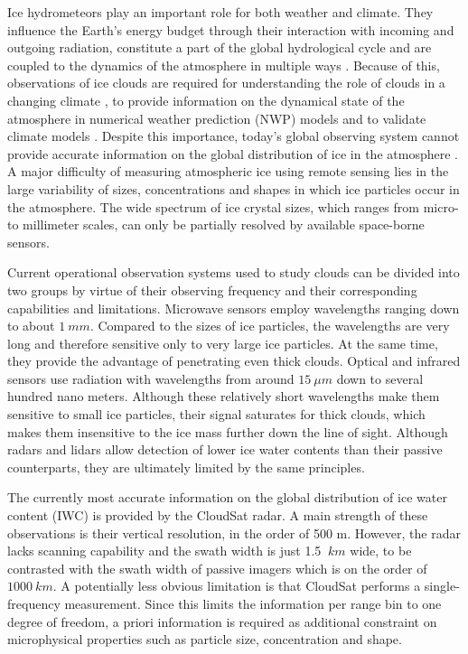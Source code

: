 \documentclass[journal abbreviation, manuscript]{copernicus}
\begin{document}
\introduction  %


Ice hydrometeors play an important role for both weather and climate. They
influence the Earth's energy budget through their interaction with incoming and
outgoing radiation, constitute a part of the global hydrological cycle and are
coupled to the dynamics of the atmosphere in multiple ways \citep{bony15}.
Because of this, observations of ice clouds are required for understanding the
role of clouds in a changing climate \citep{boucher13}, to provide information
on the dynamical state of the atmosphere in numerical weather prediction (NWP)
models \citep{geer} and to validate climate models \citep{waliser09}. Despite
this importance, today's global observing system cannot provide accurate
information on the global distribution of ice in the atmosphere
\citep{eliasson11,duncan18a}. A major difficulty of measuring atmospheric ice using
remote sensing lies in the large variability of sizes, concentrations and shapes
in which ice particles occur in the atmosphere. The wide spectrum of ice crystal
sizes, which ranges from micro- to millimeter scales, can only be partially
resolved by available space-borne sensors.

Current operational observation systems used to study clouds can be divided into
two groups by virtue of their observing frequency and their corresponding
capabilities and limitations. Microwave sensors employ wavelengths ranging down
to about $1\ \unit{mm}$. Compared to the sizes of ice particles, the wavelengths
are very long and therefore sensitive only to very large ice particles. At the
same time, they provide the advantage of penetrating even thick clouds. Optical
and infrared sensors use radiation with wavelengths from around $15\ \unit{\mu
  m}$ down to several hundred nano meters. Although these relatively short
wavelengths make them sensitive to small ice particles, their signal saturates
for thick clouds, which makes them insensitive to the ice mass further down the
line of sight. Although radars and lidars allow detection of lower ice water
contents than their passive counterparts, they are ultimately limited by the
same principles.

The currently most accurate information on the global distribution of ice water
content (IWC) is provided by the CloudSat radar. A main strength of these
observations is their vertical resolution, in the order of 500 m. However, the
radar lacks scanning capability and the swath width is just 1.5 $\ \unit{km}$
wide, to be contrasted with the swath width of passive imagers which is on the
order of $1000\ \unit{km}$. A potentially less obvious limitation is that
CloudSat performs a single-frequency measurement. Since this limits the
information per range bin to one degree of freedom, a priori information is
required as additional constraint on microphysical properties such as particle
size, concentration and shape.
\end{document}
